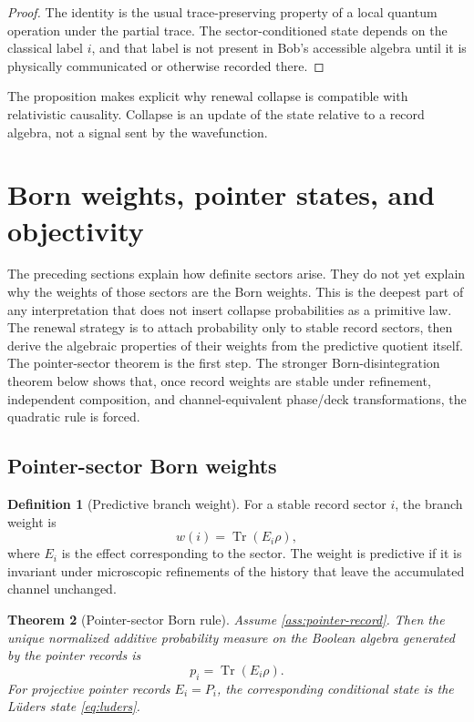\documentclass[11pt]{article}
\numberwithin{equation}{section}
\newtheorem{theorem}{Theorem}[section]
\theoremstyle{definition}
\newtheorem{definition}[theorem]{Definition}
\theoremstyle{remark}
\newcommand{\Tr}{\operatorname{Tr}}
\begin{document}
\begin{proof}
The identity is the usual trace-preserving property of a local quantum operation under the partial trace.  The sector-conditioned state depends on the classical label \(i\), and that label is not present in Bob's accessible algebra until it is physically communicated or otherwise recorded there.
\end{proof}

The proposition makes explicit why renewal collapse is compatible with relativistic causality.  Collapse is an update of the state relative to a record algebra, not a signal sent by the wavefunction.

\section{Born weights, pointer states, and objectivity}
\label{sec:born}

The preceding sections explain how definite sectors arise.  They do not yet explain why the weights of those sectors are the Born weights.  This is the deepest part of any interpretation that does not insert collapse probabilities as a primitive law.  The renewal strategy is to attach probability only to stable record sectors, then derive the algebraic properties of their weights from the predictive quotient itself.  The pointer-sector theorem is the first step.  The stronger Born-disintegration theorem below shows that, once record weights are stable under refinement, independent composition, and channel-equivalent phase/deck transformations, the quadratic rule is forced.

\subsection{Pointer-sector Born weights}

\begin{definition}[Predictive branch weight]
For a stable record sector \(i\), the branch weight is
\begin{equation}
\label{eq:branch-weight}
  w(i)=\Tr(E_i\rho),
\end{equation}
where \(E_i\) is the effect corresponding to the sector.  The weight is predictive if it is invariant under microscopic refinements of the history that leave the accumulated channel unchanged.
\end{definition}

\begin{theorem}[Pointer-sector Born rule]
\label{thm:pointer-born}
Assume \cref{ass:pointer-record}.  Then the unique normalized additive probability measure on the Boolean algebra generated by the pointer records is
\begin{equation}
\label{eq:pointer-born}
  p_i=\Tr(E_i\rho).
\end{equation}
For projective pointer records \(E_i=P_i\), the corresponding conditional state is the L\"uders state \eqref{eq:luders}.
\end{theorem}
\end{document}
